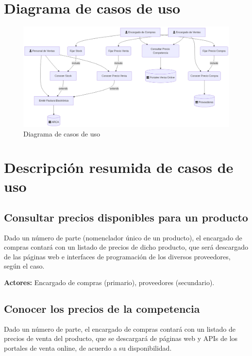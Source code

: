 \pagebreak 

\section{Diagrama de casos de uso}

\begin{figure}[h!]
	\vspace{20pt}
	\centering
	\vspace{15pt}
	\includegraphics[width=\textwidth]{img/01-diagrama-casos-uso}
	\caption{Diagrama de casos de uso}
	\vspace{15pt}
\end{figure}

\pagebreak

\section{Descripción resumida de casos de uso}

\subsection{Consultar precios disponibles para un producto}

Dado un número de parte (nomenclador único de un producto),
el encargado de compras contará con un listado de precios de dicho producto,
que será descargado de las páginas web e interfaces de programación de los diversos proveedores,
según el caso.

\textbf{Actores:} Encargado de compras (primario), proveedores (secundario).

\subsection{Conocer los precios de la competencia}

Dado un número de parte,
el encargado de compras contará con un listado de precios de venta del producto,
que se descargará de páginas web y APIs de los portales de venta online,
de acuerdo a su disponibilidad.


